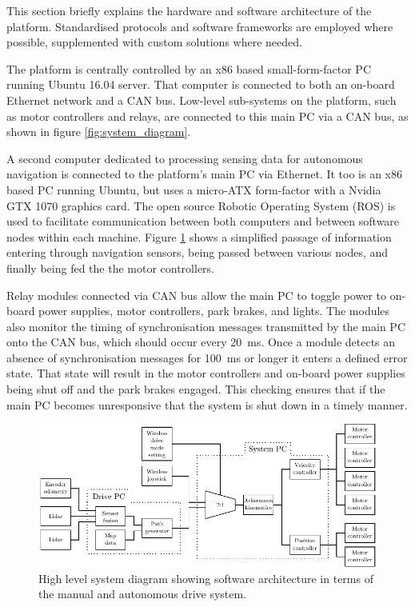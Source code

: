 \documentclass[preprint,authoryear,12pt]{elsarticle}
\begin{document}
        This section briefly explains the hardware and software architecture of the platform.
        Standardised protocols and software frameworks are employed where possible, supplemented with custom solutions where needed.

        The platform is centrally controlled by an x86 based small-form-factor PC running Ubuntu 16.04 server.
        That computer is connected to both an on-board Ethernet network and a CAN bus.
        Low-level sub-systems on the platform, such as motor controllers and relays, are connected to this main PC via a CAN bus, as shown in figure \ref{fig:system_diagram}.
        
        A second computer dedicated to processing sensing data for autonomous navigation is connected to the platform's main PC via Ethernet.
        It too is an x86 based PC running Ubuntu, but uses a micro-ATX form-factor with a Nvidia GTX 1070 graphics card.
        The open source Robotic Operating System (ROS) is used to facilitate communication between both computers and between software nodes within each machine.
        Figure \ref{fig:system_diagram_software} shows a simplified passage of information entering through navigation sensors, being passed between various nodes, and finally being fed the the motor controllers.

        Relay modules connected via CAN bus allow the main PC to toggle power to on-board power supplies, motor controllers, park brakes, and lights.
        The modules also monitor the timing of synchronisation messages transmitted by the main PC onto the CAN bus, which should occur every \SI{20}{\milli\second}.
        Once a module detects an absence of synchronisation messages for \SI{100}{\milli\second} or longer it enters a defined error state.
        That state will result in the motor controllers and on-board power supplies being shut off and the park brakes engaged.
        This checking ensures that if the main PC becomes unresponsive that the system is shut down in a timely manner.

        \begin{figure}[htb]
            \centering
            \includegraphics[width=\linewidth]{imgs/system_diagram/software.pdf}
            \caption{High level system diagram showing software architecture in terms of the manual and autonomous drive system.}
            \label{fig:system_diagram_software}
        \end{figure}
\end{document}
